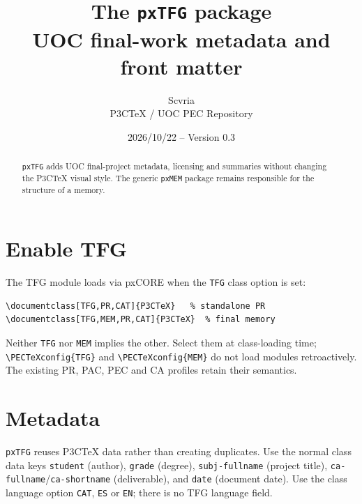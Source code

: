 \documentclass[11pt,a4paper]{article}
\title{The \texttt{pxTFG} package\\\large UOC final-work metadata and front matter}
\author{Scvria\\P3CTeX / UOC PEC Repository}
\date{2026/10/22 -- Version 0.3}
\begin{document}
\maketitle
\begin{abstract}
\texttt{pxTFG} adds UOC final-project metadata, licensing and summaries
without changing the P3CTeX visual style. The generic \texttt{pxMEM}
package remains responsible for the structure of a memory.
\end{abstract}
\tableofcontents
\setlength{\emergencystretch}{4em}

\section{Enable TFG}
The TFG module loads via pxCORE when the \texttt{TFG} class option is set:
\begin{verbatim}
\documentclass[TFG,PR,CAT]{P3CTeX}   % standalone PR
\documentclass[TFG,MEM,PR,CAT]{P3CTeX}  % final memory
\end{verbatim}
Neither \texttt{TFG} nor \texttt{MEM} implies the other. Select them at
class-loading time; \verb|\PECTeXconfig{TFG}| and
\verb|\PECTeXconfig{MEM}| do not load modules retroactively.
The existing PR, PAC, PEC and CA profiles retain their semantics.

\section{Metadata}
\texttt{pxTFG} reuses P3CTeX data rather than creating duplicates.
Use the normal class data keys \texttt{student} (author),
\texttt{grade} (degree), \texttt{subj-fullname} (project title),
\texttt{ca-fullname}/\texttt{ca-shortname} (deliverable), and
\texttt{date} (document date). Use the class language option
\texttt{CAT}, \texttt{ES} or \texttt{EN}; there is no TFG language field.
\end{document}
